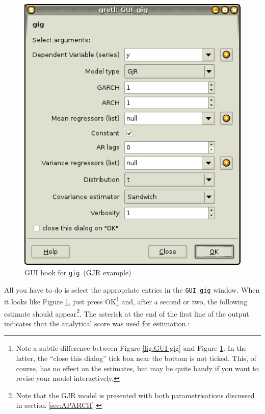 \documentclass[a4paper,11pt]{article}
\newcommand{\gig}{\texttt{gig}}
\begin{document}
\begin{figure}[htb]
  \centering
  \includegraphics[scale=0.45]{graphs/GUI-gig-GJR}
  \caption{GUI hook for \gig\ (GJR example)}
  \label{fig:GUI-gig-GJR}
\end{figure}

All you have to do is select the appropriate entries in the
\texttt{GUI\_gig} window. When it looks like Figure
\ref{fig:GUI-gig-GJR}, just press OK\footnote{Note a subtle difference
  between Figure \ref{fig:GUI-gig} and Figure
  \ref{fig:GUI-gig-GJR}. In the latter, the ``close this dialog'' tick
  box near the bottom is not ticked. This, of course, has no effect on
  the estimates, but may be quite handy if you want to revise your
  model interactively.} and, after a second or two, the following
estimate should appear\footnote{Note that the GJR model is presented
  with both parametrisations discussed in section
  \ref{sec:APARCH}.}. The asterisk at the end of the first line of the
output indicates that the analytical score was used for estimation.:
\end{document}
